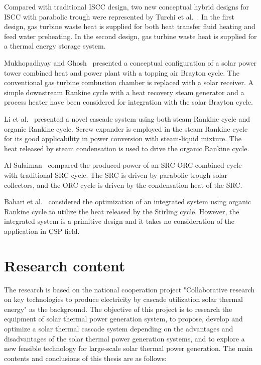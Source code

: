 Compared with traditional ISCC design, two new conceptual hybrid designs for ISCC with parabolic trough were represented by Turchi et al.~\cite{Turchi2014}. In the first design, gas turbine waste heat is supplied for both heat transfer fluid heating and feed water preheating. In the second design, gas turbine waste heat is supplied for a thermal energy storage system.

Mukhopadhyay and Ghosh~\cite{Mukhopadhyay2016} presented a conceptual configuration of a solar power tower combined heat and power plant with a topping air Brayton cycle. The conventional gas turbine combustion chamber is replaced with a solar receiver. A simple downstream Rankine cycle with a heat recovery steam generator and a process heater have been considered for integration with the solar Brayton cycle.

Li et al.~\cite{Li2016a} presented a novel cascade system using both steam Rankine cycle and organic Rankine cycle. Screw expander is employed in the steam Rankine cycle for its good applicability in power conversion with steam-liquid mixture. The heat released by steam condensation is used to drive the organic Rankine cycle.

Al-Sulaiman~\cite{AlSulaiman2014} compared the produced power of an SRC-ORC combined cycle with traditional SRC cycle. The SRC is driven by parabolic trough solar collectors, and the ORC cycle is driven by the condensation heat of the SRC.

Bahari et al.~\cite{Bahari2016} considered the optimization of an integrated system using organic Rankine cycle to utilize the heat released by the Stirling cycle. However, the integrated system is a primitive design and it takes no consideration of the application in CSP field.

\section{Research content}\label{sec:3}

The research is based on the national cooperation project "Collaborative research on key technologies to produce electricity by cascade utilization solar thermal energy" as the background. The objective of this project is to research the equipment of solar thermal power generation system, to propose, develop and optimize a solar thermal cascade system depending on the advantages and disadvantages of the solar thermal power generation systems, and to explore a new feasible technology for large-scale solar thermal power generation. The main contents and conclusions of this thesis are as follows:


